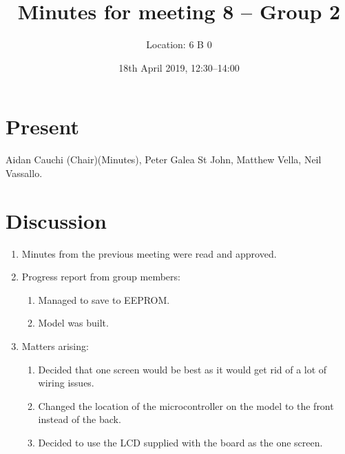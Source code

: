 \documentclass[11pt,a4paper]{article}
\title{ Minutes for meeting 8 -- Group 2}
\author{Location: 6 B 0}
\date{18th April 2019, 12:30--14:00}
\begin{document}
\maketitle

\section*{Present}
Aidan Cauchi (Chair)(Minutes),
Peter Galea St John,
Matthew Vella,
Neil Vassallo.



\section*{Discussion}

\begin{enumerate}


\item Minutes from the previous meeting were read and approved.

\item Progress report from group members:
   \begin{enumerate}
   \item Managed to save to EEPROM.
   \item Model was built.
   \end{enumerate}

\item Matters arising:
\begin{enumerate}
	\item Decided that one screen would be best as it would get rid of a lot of wiring issues.
	\item Changed the location of the microcontroller on the model to the front instead of the back.
	\item Decided to use the LCD supplied with the board as the one screen.
\end{enumerate}

\end{enumerate}
\end{document}
